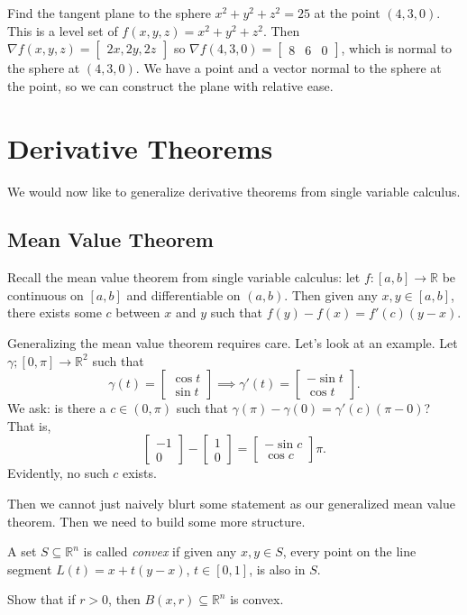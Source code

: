 \documentclass[11pt]{article}
\theoremstyle{definition}
\newcommand{\R}{\mathbb{R}}                      %
\newcommand{\mat}{\begin{bmatrix}}
\newcommand{\trix}{\end{bmatrix}}
\begin{document}
\ex Find the tangent plane to the sphere $x^2+y^2+z^2=25$ at the point $(4,3,0)$. This is a level set of $f(x,y,z)=x^2+y^2+z^2$. Then $\nabla f(x,y,z)=\mat 2x,2y,2z\trix$ so $\nabla f(4,3,0)=\mat 8&6&0\trix$, which is normal to the sphere at $(4,3,0)$. We have a point and a vector normal to the sphere at the point, so we can construct the plane with relative ease.

\section{Derivative Theorems}
We would now like to generalize derivative theorems from single variable calculus.

\subsection{Mean Value Theorem}

Recall the mean value theorem from single variable calculus: let $f:[a,b]\to\R$ be continuous on $[a,b]$ and differentiable on $(a,b)$. Then given any $x,y\in[a,b]$, there exists some $c$ between $x$ and $y$ such that $f(y)-f(x)=f'(c)(y-x)$.

Generalizing the mean value theorem requires care. Let's look at an example.
\ex Let $\gamma;[0,\pi]\to\R^2$ such that
$$
\gamma(t)=\mat \cos t \\ \sin t\trix\implies  \gamma'(t)=\mat -\sin t\\ \cos t\trix.
$$
We ask: is there a $c\in (0,\pi)$ such that $\gamma(\pi)-\gamma(0)=\gamma'(c)(\pi-0)$? That is,
$$
\mat -1 \\ 0 \trix -\mat 1 \\ 0 \trix =\mat -\sin c \\ \cos c \trix \pi.
$$
Evidently, no such $c$ exists.

Then we cannot just naively blurt some statement as our generalized mean value theorem. Then we need to build some more structure.

\begin{mdframed}[backgroundcolor = blue!10]
\vspace{+0.1cm}

 A set $S\subseteq \R^n$ is called \textit{convex} if given any $x,y\in S$, every point on the line segment $L(t)=x+t(y-x)$, $t\in[0,1]$, is also in $S$.

\end{mdframed}

\ex Show that if $r>0$, then $B(x,r)\subseteq \R^n$ is convex.
\end{document}
